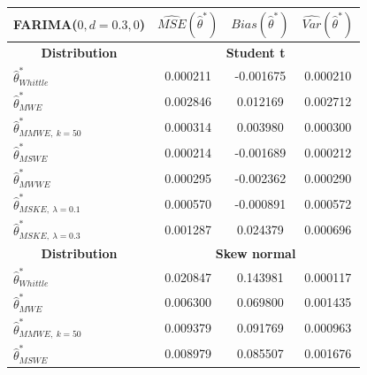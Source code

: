 \documentclass[
  11pt,
]{article}
\begin{document}
\begin{table}[]
\centering
\begin{tabular}{|l|c|c|c|}
\hline
\multicolumn{1}{|c|}{\textbf{FARIMA($0,d = 0.3,0$)}}          & $\widehat{MSE}( \hat \theta^*)$ & $\widehat{Bias}( \hat \theta^*)$ & $\widehat{Var}( \hat \theta^*)$ \\ \hline
\multicolumn{1}{|c|}{\textbf{Distribution}}                   & \multicolumn{3}{c|}{\textbf{Student t}}                             \\ \hline
$\hat \theta^*_{Whittle}$                                     & 0.000211             & -0.001675             & 0.000210             \\ \hline
$\hat \theta^*_{MWE}$                                         & 0.002846             & 0.012169              & 0.002712             \\ \hline
$\hat \theta^*_{MMWE, \ k = 50}$                              & 0.000314             & 0.003980              & 0.000300             \\ \hline
$\hat \theta^*_{MSWE}$                                        & 0.000214             & -0.001689             & 0.000212             \\ \hline
$\hat \theta^*_{MWWE}$                                        & 0.000295             & -0.002362             & 0.000290             \\ \hline
$\hat \theta^*_{MSKE, \ \lambda = 0.1}$                       & 0.000570             & -0.000891             & 0.000572             \\ \hline
$\hat \theta^*_{MSKE, \ \lambda = 0.3}$                       & 0.001287             & 0.024379              & 0.000696             \\ \hline
\multicolumn{1}{|c|}{\textbf{Distribution}}                   & \multicolumn{3}{c|}{\textbf{Skew normal}}                           \\ \hline
$\hat \theta^*_{Whittle}$                                     & 0.020847             & 0.143981              & 0.000117             \\ \hline
$\hat \theta^*_{MWE}$                                         & 0.006300             & 0.069800              & 0.001435             \\ \hline
$\hat \theta^*_{MMWE, \ k = 50}$                              & 0.009379             & 0.091769              & 0.000963             \\ \hline
$\hat \theta^*_{MSWE}$                                        & 0.008979             & 0.085507              & 0.001676             \\ \hline

\end{tabular}
\end{table}
\end{document}
